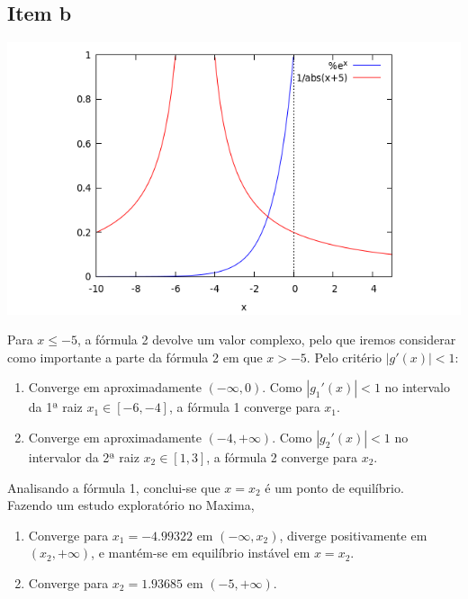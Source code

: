 {\subsection{Item b}

\begin{center} \includegraphics[scale=0.5]{2017E_3_2} \end{center}
Para $x \leq -5$, a fórmula 2 devolve um valor complexo, pelo que iremos considerar como importante a parte da fórmula 2 em que $x > -5$.
Pelo critério $|g'(x)|<1$:
\begin{enumerate}
    \item Converge em aproximadamente $(-\infty, 0)$. Como $|g_1'(x)|<1$ no intervalo da 1ª raiz $x_1 \in [-6,-4]$, a fórmula 1 converge para $x_1$.
    \item Converge em aproximadamente $(-4,+\infty)$. Como $|g_2'(x)|<1$ no intervalor da 2ª raiz $x_2 \in [1,3]$, a fórmula 2 converge para $x_2$.
\end{enumerate}
Analisando a fórmula 1, conclui-se que $x=x_2$ é um ponto de equilíbrio.\\ 
Fazendo um estudo exploratório no Maxima,
\begin{enumerate}
    \item Converge para $x_1=-4.99322$ em $(-\infty, x_2)$, diverge positivamente em $(x_2, +\infty)$, e mantém-se em equilíbrio instável em $x=x_2$.
    \item Converge para $x_2=1.93685$ em $(-5, +\infty)$.
\end{enumerate}

}

